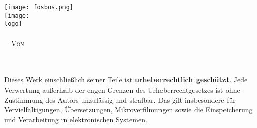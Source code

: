 \begin{titlepage}
\begin{center}
\texttt{[image: fosbos.png]}\\[15ex]

\texttt{[image: \\logo]}\\[5ex]
\LARGE{\textsc{\documentTitle}}\\[1ex]

\vspace*{\fill}
\normalsize
\noindent
\xrfill[0.7ex]{1pt}\ \ \textsc{Von}\ \ \xrfill[0.7ex]{1pt}\\
\textsc{\authorName}\\[1ex]
\textsc{\deadline}\\[10ex]


\end{center}
\small
\noindent
Dieses Werk einschließlich seiner Teile ist \textbf{urheberrechtlich geschützt}.
Jede Verwertung außerhalb der engen Grenzen des Urheberrechtgesetzes ist ohne
Zustimmung des Autors unzulässig und strafbar. Das gilt insbesondere für
Vervielfältigungen, Übersetzungen, Mikroverfilmungen sowie die Einspeicherung
und Verarbeitung in elektronischen Systemen.
\end{titlepage}